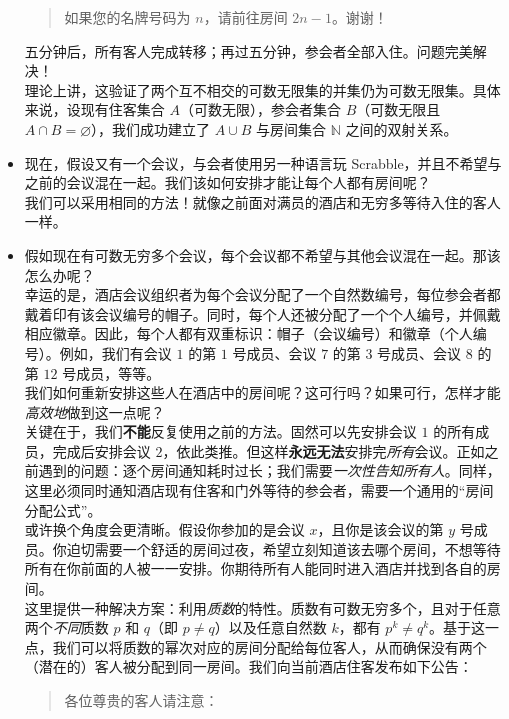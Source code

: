 \begin{itemize}
\begin{quotation}
              如果您的名牌号码为 $n$，请前往房间 $2n - 1$。谢谢！
          \end{quotation}
          五分钟后，所有客人完成转移；再过五分钟，参会者全部入住。问题完美解决！\\

          理论上讲，这验证了两个互不相交的可数无限集的并集仍为可数无限集。具体来说，设现有住客集合 $A$（可数无限），参会者集合 $B$（可数无限且 $A \cap B = \varnothing$），我们成功建立了 $A \cup B$ 与房间集合 $\mathbb{N}$ 之间的双射关系。\\
    \item 现在，假设又有一个会议，与会者使用另一种语言玩 Scrabble，并且不希望与之前的会议混在一起。我们该如何安排才能让每个人都有房间呢？\\

          我们可以采用相同的方法！就像之前面对满员的酒店和无穷多等待入住的客人一样。\\
    \item 假如现在有可数无穷多个会议，每个会议都不希望与其他会议混在一起。那该怎么办呢？\\

          幸运的是，酒店会议组织者为每个会议分配了一个自然数编号，每位参会者都戴着印有该会议编号的帽子。同时，每个人还被分配了一个个人编号，并佩戴相应徽章。因此，每个人都有双重标识：帽子（会议编号）和徽章（个人编号）。例如，我们有会议 $1$ 的第 $1$ 号成员、会议 $7$ 的第 $3$ 号成员、会议 $8$ 的第 $12$ 号成员，等等。\\

          我们如何重新安排这些人在酒店中的房间呢？这可行吗？如果可行，怎样才能\emph{高效地}做到这一点呢？\\

          关键在于，我们\textbf{不能}反复使用之前的方法。固然可以先安排会议 $1$ 的所有成员，完成后安排会议 $2$，依此类推。但这样\textbf{永远无法}安排完\emph{所有}会议。正如之前遇到的问题：逐个房间通知耗时过长；我们需要\emph{一次性告知所有人}。同样，这里必须同时通知酒店现有住客和门外等待的参会者，需要一个通用的``房间分配公式''。\\

          或许换个角度会更清晰。假设你参加的是会议 $x$，且你是该会议的第 $y$ 号成员。你迫切需要一个舒适的房间过夜，希望立刻知道该去哪个房间，不想等待所有在你前面的人被一一安排。你期待所有人能同时进入酒店并找到各自的房间。\\

          这里提供一种解决方案：利用\emph{质数}的特性。质数有可数无穷多个，且对于任意两个\emph{不同}质数 $p$ 和 $q$（即 $p \ne q$）以及任意自然数 $k$，都有 $p^k \ne q^k$。基于这一点，我们可以将质数的幂次对应的房间分配给每位客人，从而确保没有两个（潜在的）客人被分配到同一房间。我们向当前酒店住客发布如下公告：
          \begin{quotation}
              各位尊贵的客人请注意：
              

\end{quotation}
\end{itemize}
